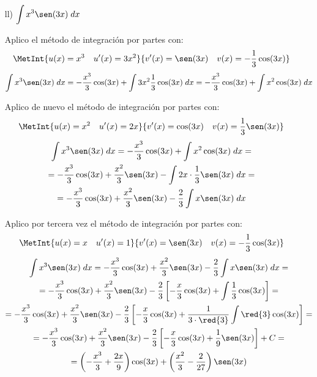 \begin{ejercicio}
\begin{enumerate}
    \item[ll)] $\displaystyle \int x^3\sen(3x)\;dx$

    Aplico el método de integración por partes con:
    \begin{equation*}
        \MetInt{u(x)=x^3 \quad u'(x)=3x^2}{v'(x)=\sen(3x) \quad v(x)=-\frac{1}{3}\cos(3x)}
    \end{equation*}
    \begin{equation*}
        \int x^3\sen(3x)\;dx = -\frac{x^3}{3}\cos(3x)+\int 3x^2\frac{1}{3}\cos(3x)\;dx
        = -\frac{x^3}{3}\cos(3x)+\int x^2\cos(3x)\;dx
    \end{equation*}

    Aplico de nuevo el método de integración por partes con:
    \begin{equation*}
        \MetInt{u(x)=x^2 \quad u'(x)=2x}{v'(x)=\cos(3x) \quad v(x)=\frac{1}{3}\sen(3x)}
    \end{equation*}
    \begin{multline*}
        \int x^3\sen(3x)\;dx
        = -\frac{x^3}{3}\cos(3x)+\int x^2\cos(3x)\;dx
        =\\=  -\frac{x^3}{3}\cos(3x) +\frac{x^2}{3}\sen(3x)-\int 2x\cdot \frac{1}{3}\sen(3x)\;dx
        =\\= -\frac{x^3}{3}\cos(3x) +\frac{x^2}{3}\sen(3x)-\frac{2}{3}\int x\sen(3x)\;dx
    \end{multline*}

    Aplico por tercera vez el método de integración por partes con:
    \begin{equation*}
        \MetInt{u(x)=x \quad u'(x)=1}{v'(x)=\sen(3x) \quad v(x)=-\frac{1}{3}\cos(3x)}
    \end{equation*}
    \begin{multline*}
        \int x^3\sen(3x)\;dx
        = -\frac{x^3}{3}\cos(3x) +\frac{x^2}{3}\sen(3x)-\frac{2}{3}\int x\sen(3x)\;dx
        =\\=
        -\frac{x^3}{3}\cos(3x) +\frac{x^2}{3}\sen(3x)-\frac{2}{3}\left[-\frac{x}{3}\cos(3x)+\int\frac{1}{3}\cos(3x) \right]
        =\\=
        -\frac{x^3}{3}\cos(3x) +\frac{x^2}{3}\sen(3x)-\frac{2}{3}\left[-\frac{x}{3}\cos(3x)+\frac{1}{3\cdot \red{3}}\int \red{3}\cos(3x) \right]
        =\\=
        -\frac{x^3}{3}\cos(3x) +\frac{x^2}{3}\sen(3x)-\frac{2}{3}\left[-\frac{x}{3}\cos(3x)+\frac{1}{9}\sen(3x) \right] +C
        =\\= \left(-\frac{x^3}{3}+\frac{2x}{9}\right)\cos(3x) +\left(\frac{x^2}{3}-\frac{2}{27}\right)\sen(3x)
    \end{multline*}


\end{enumerate}
\end{ejercicio}
